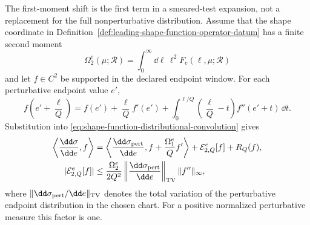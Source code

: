 \begin{controlledapproximation}
\label{ca:shape-function-smeared-moment-expansion}
The first-moment shift is the first term in a smeared-test expansion, not a
replacement for the full nonperturbative distribution.  Assume that the shape
coordinate in Definition~\ref{def:leading-shape-function-operator-datum} has a
finite second moment
\[
  \Omega_2^e(\mu;\mathcal R)
  =
  \int_0^\infty\dd\ell\,\ell^2F_e(\ell,\mu;\mathcal R)
\]
and let \(f\in C^2\) be supported in the declared endpoint window.  For each
perturbative endpoint value \(e'\),
\[
  f\!\left(e'+\frac{\ell}{Q}\right)
  =
  f(e')
  +
  \frac{\ell}{Q}f'(e')
  +
  \int_0^{\ell/Q}\!
    \left(\frac{\ell}{Q}-t\right)f''(e'+t)\,\dd t .
\]
Substitution into
\eqref{eq:shape-function-distributional-convolution} gives
\begin{equation}
\begin{aligned}
  \left\langle \frac{\dd\sigma}{\dd e},f\right\rangle
  &=
  \left\langle
    \frac{\dd\sigma_{\rm pert}}{\dd e},
    f+\frac{\Omega_1^e}{Q}f'
  \right\rangle
  +
  \mathcal E_{2,Q}^e[f]
  +
  R_Q(f),
\\
  |\mathcal E_{2,Q}^e[f]|
  &\le
  \frac{\Omega_2^e}{2Q^2}
  \left\|\frac{\dd\sigma_{\rm pert}}{\dd e}\right\|_{\rm TV}
  \|f''\|_\infty ,
\end{aligned}
  \label{eq:shape-function-smeared-moment-expansion}
\end{equation}
where \(\|\dd\sigma_{\rm pert}/\dd e\|_{\rm TV}\) denotes the total variation
of the perturbative endpoint distribution in the chosen chart.  For a
positive normalized perturbative measure this factor is one.


\end{controlledapproximation}
